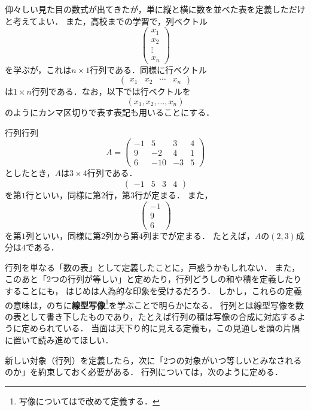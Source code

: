 仰々しい見た目の数式が出てきたが，単に縦と横に数を並べた表を定義しただけと考えてよい．
また，高校までの学習で，列ベクトル
\[
  \begin{pmatrix} x_1 \\ x_2 \\ \vdots \\ x_n \end{pmatrix}
\]
を学ぶが，これは$n \times 1$行列である．同様に行ベクトル
\[
  \begin{pmatrix} x_1 & x_2 & \cdots & x_n \end{pmatrix}
\]
は$1 \times n$行列である．なお，以下では行ベクトルを
\[
  (x_1, x_2, \dots, x_n)
\]
のようにカンマ区切りで表す表記も用いることにする．

\begin{example}{行列}{行列}
  \[
    A =
    \begin{pmatrix}
      -1 & 5 & 3 & 4 \\
      9 & -2 & 4 & 1 \\
      6 & -10 & -3 & 5
    \end{pmatrix}
  \]
  としたとき，$A$は$3 \times 4$行列である．
  \[
    \begin{pmatrix} -1 & 5 & 3 & 4 \end{pmatrix}
  \]
  を第$1$行といい，同様に第$2$行，第$3$行が定まる．
  また，
  \[
    \begin{pmatrix} -1 \\ 9 \\ 6 \end{pmatrix}
  \]
  を第$1$列といい，同様に第$2$列から第$4$列までが定まる．
  たとえば，$A$の$(2, 3)$成分は$4$である．
\end{example}

\begin{mycolumn}
  行列を単なる「数の表」として定義したことに，戸惑うかもしれない．
  また，このあと「2つの行列が等しい」と定めたり，行列どうしの和や積を定義したりすることにも，
  はじめは人為的な印象を受けるだろう．
  しかし，これらの定義の意味は，のちに\textbf{線型写像}\footnote{写像についてはで改めて定義する．}を学ぶことで明らかになる．
  行列とは線型写像を数の表として書き下したものであり，たとえば行列の積は写像の合成に対応するように定められている．
  当面は天下り的に見える定義も，この見通しを頭の片隅に置いて読み進めてほしい．
\end{mycolumn}

新しい対象（行列）を定義したら，次に「$2$つの対象がいつ等しいとみなされるのか」を約束しておく必要がある．
行列については，次のように定める．
 
